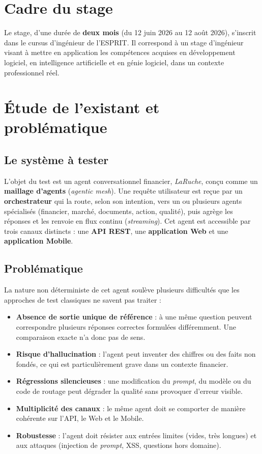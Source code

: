 \documentclass[12pt,a4paper,oneside]{report}
\newcommand{\sut}{\textit{LaRuche}}
\begin{document}
\section{Cadre du stage}
Le stage, d'une durée de \textbf{deux mois} (du 12 juin 2026 au 12 août 2026),
s'inscrit dans le cursus d'ingénieur de l'ESPRIT. Il correspond à un stage
d'ingénieur visant à mettre en application les compétences acquises en
développement logiciel, en intelligence artificielle et en génie logiciel, dans un
contexte professionnel réel.

\section{Étude de l'existant et problématique}

\subsection{Le système à tester}
L'objet du test est un agent conversationnel financier, \sut{}, conçu comme un
\textbf{maillage d'agents} (\textit{agentic mesh}). Une requête utilisateur est reçue
par un \textbf{orchestrateur} qui la route, selon son intention, vers un ou plusieurs
agents spécialisés (financier, marché, documents, action, qualité), puis agrège les
réponses et les renvoie en flux continu (\textit{streaming}). Cet agent est accessible
par trois canaux distincts : une \textbf{API REST}, une \textbf{application Web} et une
\textbf{application Mobile}.

\subsection{Problématique}
La nature non déterministe de cet agent soulève plusieurs difficultés que les
approches de test classiques ne savent pas traiter :

\begin{itemize}[leftmargin=*]
  \item \textbf{Absence de sortie unique de référence} : à une même question peuvent
  correspondre plusieurs réponses correctes formulées différemment. Une comparaison
  exacte n'a donc pas de sens.
  \item \textbf{Risque d'hallucination} : l'agent peut inventer des chiffres ou des
  faits non fondés, ce qui est particulièrement grave dans un contexte financier.
  \item \textbf{Régressions silencieuses} : une modification du \textit{prompt}, du
  modèle ou du code de routage peut dégrader la qualité sans provoquer d'erreur
  visible.
  \item \textbf{Multiplicité des canaux} : le même agent doit se comporter de manière
  cohérente sur l'API, le Web et le Mobile.
  \item \textbf{Robustesse} : l'agent doit résister aux entrées limites (vides, très
  longues) et aux attaques (injection de \textit{prompt}, XSS, questions hors domaine).
\end{itemize}
\end{document}
